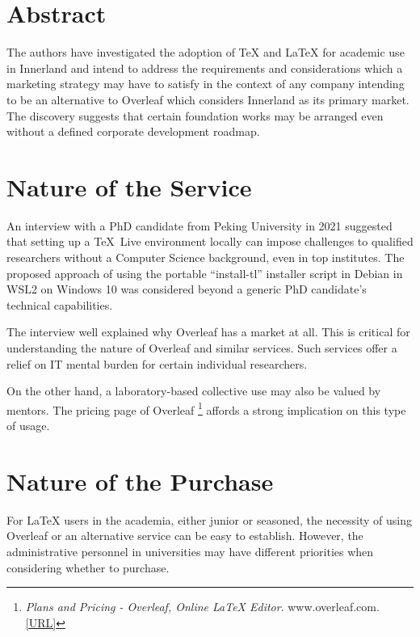 \documentclass[a4paper,11pt]{article}
\begin{document}

\fulldoctitle



\section*{Abstract}
The authors have investigated the adoption of {\TeX} and {\LaTeX} for academic use in Innerland
and intend to address the requirements and considerations which a marketing strategy may have to satisfy
in the context of any company intending to be an alternative to Overleaf which considers Innerland as its primary market.
The discovery suggests that certain foundation works may be arranged even without a defined corporate development roadmap.




\section{Nature of the Service}
An interview with a PhD candidate from Peking University in 2021 suggested that
setting up a \TeX~Live environment locally can impose challenges to qualified researchers
without a Computer Science background, even in top institutes.
The proposed approach of using the portable ``install-tl'' installer script in Debian in WSL2 on Windows 10
was considered beyond a generic PhD candidate's technical capabilities.

The interview well explained why Overleaf has a market at all.
This is critical for understanding the nature of Overleaf and similar services.
Such services offer a relief on IT mental burden for certain individual researchers.

On the other hand, a laboratory-based collective use may also be valued by mentors.
The pricing page of Overleaf
\footnote{\textit{Plans and Pricing - Overleaf, Online LaTeX Editor}. www.overleaf.com. \href{https://www.overleaf.com/user/subscription/plans}{[URL]}}
affords a strong implication on this type of usage.





\section{Nature of the Purchase}
For \LaTeX{} users in the academia, either junior or seasoned,
the necessity of using Overleaf or an alternative service can be easy to establish.
However, the administrative personnel in universities
may have different priorities when considering whether to purchase.
\end{document}
